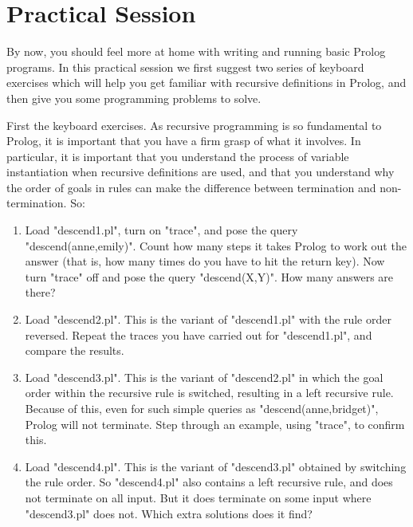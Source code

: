 \section{Practical Session}\label{SEC.L3.PRAXIS}



By now, you should feel more at home with writing and running basic
Prolog programs. In this practical session we first suggest two series
of keyboard exercises which will help you get familiar with recursive
definitions in Prolog, and then give you some programming problems to
solve.

First the keyboard exercises. As recursive programming is so
fundamental to Prolog, it is important that you have a firm grasp of
what it involves. In particular, it is important that you understand
the process of variable instantiation when recursive definitions are
used, and that you understand why the order of goals in rules can make
the difference between termination and non-termination. So:

\begin{enumerate}


\item{} Load "descend1.pl", turn on "trace", and pose the query
"descend(anne,emily)". Count how many steps it takes Prolog to work
out the answer (that is, how many times do you have to hit the return
key).  Now turn "trace" off and pose the query "descend(X,Y)". How
many answers are there?

\item{}Load "descend2.pl". This is the variant of "descend1.pl" with
the rule order reversed. Repeat the traces you have
carried out for "descend1.pl", and compare the results.

\item{}Load "descend3.pl". This is the variant of "descend2.pl" in
which the goal order within the recursive rule is switched, resulting
in a left recursive rule.  Because of this, even for such simple
queries as "descend(anne,bridget)", Prolog will not terminate.  Step
through an example, using "trace", to confirm this.

\item{}Load "descend4.pl". This is the variant of "descend3.pl"
obtained by switching the rule order.  So "descend4.pl" also contains
a left recursive rule, and does not terminate on all input.  But it
does terminate on some input where "descend3.pl" does not.  Which
extra solutions does it find?

\end{enumerate}

